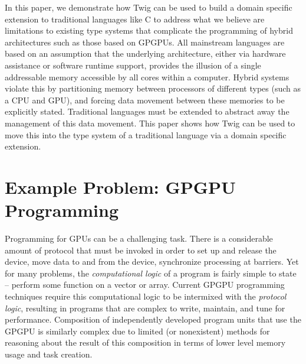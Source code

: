 \documentclass[11pt]{article}
\begin{document}
In this paper, we demonstrate how Twig can be used to build a domain specific
extension to traditional languages like C to address what we believe are
limitations to existing type systems that complicate the programming of
hybrid architectures such as those based on GPGPUs.  All mainstream
languages are based on an assumption that the underlying architecture, either
via hardware assistance or software runtime support, provides the illusion
of a single addressable memory accessible by all cores within a computer.
Hybrid systems violate this by partitioning memory between processors of 
different types (such as a CPU and GPU), and forcing data movement between
these memories to be explicitly stated.  Traditional languages must be
extended to abstract away the management of this data movement.  This paper
shows how Twig can be used to move this into the type system of a traditional
language via a domain specific extension.  %



\section{Example Problem: GPGPU Programming}

Programming for GPUs can be a challenging task. There is a
considerable amount of protocol that must be invoked in order to set
up and release the device, move data to and from the device,
synchronize processing at barriers. Yet for many problems, the
\emph{computational logic} of a program is fairly simple to state --
perform some function on a vector or array.  Current GPGPU programming
techniques require this computational logic to be intermixed with the
\emph{protocol logic}, resulting in programs that are complex to write,
maintain, and tune for performance.  Composition of independently developed
program units that use the GPGPU is similarly complex due to limited (or
nonexistent) methods for reasoning about the result of this composition in
terms of lower level memory usage and task creation.
\end{document}
